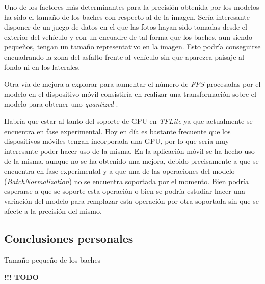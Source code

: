 Uno de los factores más determinantes para la precisión obtenida por los modelos ha sido el tamaño de los baches con respecto al de la imagen. Sería interesante disponer de un juego de datos en el que las fotos hayan sido tomadas desde el exterior del vehículo y con un encuadre de tal forma que los baches, aun siendo pequeños, tengan un tamaño representativo en la imagen. Esto podría conseguirse encuadrando la zona del asfalto frente al vehículo sin que aparezca paisaje al fondo ni en los laterales.

Otra vía de mejora a explorar para aumentar el número de \textit{FPS} procesadas por el modelo en el dispositivo móvil consistiría en realizar una transformación sobre el modelo para obtener uno \textit{quantized} \cite{s8_quantizedmodel}.

Habría que estar al tanto del soporte de GPU en \textit{TFLite} ya que actualmente se encuentra en fase experimental. Hoy en día es bastante frecuente que los dispositivos móviles tengan incorporada una GPU, por lo que sería muy interesante poder hacer uso de la misma. En la aplicación móvil se ha hecho uso de la misma, aunque no se ha obtenido una mejora, debido precisamente a que se encuentra en fase experimental y a que una de las operaciones del modelo (\textit{BatchNormalization}) \cite{s8_batchnormalization} no se encuentra soportada por el momento. Bien podría esperarse a que se soporte esta operación o bien se podría estudiar hacer una variación del modelo para remplazar esta operación por otra soportada sin que se afecte a la precisión del mismo.

\subsection{Conclusiones personales}

Tamaño pequeño de los baches

{\color{red} \textbf{!!! TODO}}